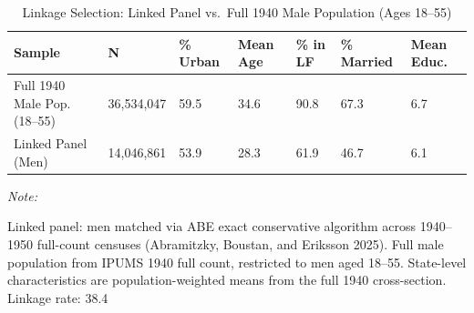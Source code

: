 \begin{table}
\centering
\caption{\label{tab:linkage}Linkage Selection: Linked Panel vs.\ Full 1940 Male Population (Ages 18--55)}
\centering
\begin{threeparttable}
\begin{tabular}[t]{lllllll}
\toprule
Sample & N & \% Urban & Mean Age & \% in LF & \% Married & Mean Educ.\\
\midrule
Full 1940 Male Pop. (18--55) & 36,534,047 & 59.5 & 34.6 & 90.8 & 67.3 & 6.7\\
Linked Panel (Men) & 14,046,861 & 53.9 & 28.3 & 61.9 & 46.7 & 6.1\\
\bottomrule
\end{tabular}
\begin{tablenotes}
\item \textit{Note: } 
\item Linked panel: men matched via ABE exact conservative algorithm across 1940--1950 full-count censuses (Abramitzky, Boustan, and Eriksson 2025). Full male population from IPUMS 1940 full count, restricted to men aged 18--55. State-level characteristics are population-weighted means from the full 1940 cross-section. Linkage rate: 38.4%
\end{tablenotes}
\end{threeparttable}
\end{table}
